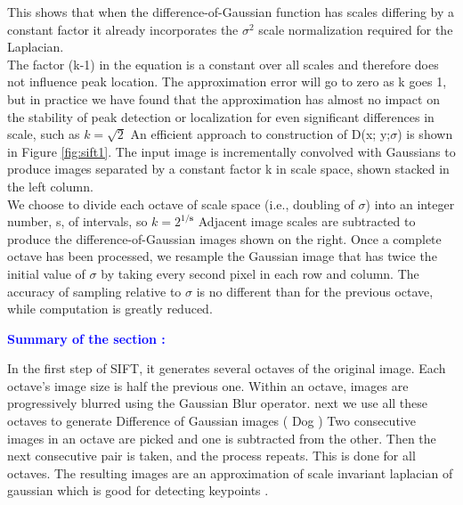 This shows that when the difference-of-Gaussian function has scales differing by a constant
factor it already incorporates the  $\sigma ^2 $
scale normalization required for the Laplacian. \\The
factor (k-1) in the equation is a constant over all scales and therefore does not influence
peak location. The approximation error will go to zero as k goes 1, but in practice we have
found that the approximation has almost no impact on the stability of peak detection or
localization for even significant differences in scale, such as $k= \sqrt{2}$
An efficient approach to construction of D(x; y;$\sigma$) is shown in Figure \ref{fig:sift1}. The input image
is incrementally convolved with Gaussians to produce images separated by a constant
factor k in scale space, shown stacked in the left column. \\We choose to divide each octave
of scale space (i.e., doubling of $\sigma$) into an integer number, s, of intervals, so $k = 2^{1/\mathbf{s}}$
Adjacent image scales are subtracted to produce the difference-of-Gaussian images shown
on the right. Once a complete octave has been processed, we resample the Gaussian image
that has twice the initial value of $\sigma$ by taking every second pixel in each row and column. The accuracy of sampling relative to $\sigma$ is no different than for the previous octave, while
computation is greatly reduced.

\newpage

\textcolor{blue}{\textbf{Summary of the section :} }

In the first step of SIFT, it generates several octaves of the original image. Each octave's image size is half the previous one. Within an octave, images are progressively blurred using the Gaussian Blur operator.
next we use all these octaves to generate Difference of Gaussian images ( Dog ) Two consecutive images in an octave are picked and one is subtracted from the other. Then the next consecutive pair is taken, and the process repeats. This is done for all octaves. The resulting images are an approximation of scale invariant laplacian of gaussian which is good for detecting keypoints .



